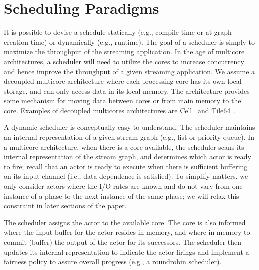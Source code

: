 \section{Scheduling Paradigms}


It is possible to devise a schedule statically (e.g., compile time or
at graph creation time) or dynamically (e.g., runtime). The goal of a
scheduler is simply to maximize the throughput of the streaming
application. In the age of multicore architectures, a scheduler will
need to utilize the cores to increase concurrency and hence improve
the throughput of a given streaming application.  We assume a
decoupled multicore architecture where each processing core has its
own local storage, and can only access data in its local memory. The
architecture provides some mechanism for moving data between cores or
from main memory to the core. Examples of decoupled multicores
architectures are Cell~\cite{cell} and Tile64~\cite{tilera}.

A dynamic scheduler is conceptually easy to understand. The scheduler
maintains an internal representation of a given stream graph (e.g.,
list or priority queue). In a multicore architecture, when there is a
core available, the scheduler scans its internal representation of the
stream graph, and determines which actor is ready to fire; recall that
an actor is ready to execute when there is sufficient buffering on its
input channel (i.e., data dependence is satisfied).  To simplify
matters, we only consider actors where the I/O rates are known and do
not vary from one instance of a phase to the next instance of the same
phase; we will relax this constraint in later sections of the paper.

The scheduler assigns the actor to the available core. The core is
also informed where the input buffer for the actor resides in memory,
and where in memory to commit (buffer) the output of the actor for its
successors. The scheduler then updates its internal representation to
indicate the actor firings and implement a fairness policy to assure
overall progress (e.g., a roundrobin scheduler).

